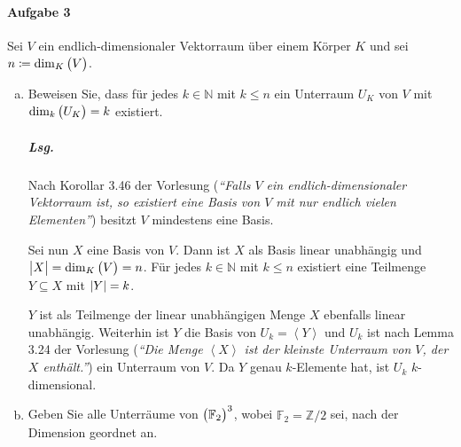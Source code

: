 \documentclass{scrreprt}
\newcommand\hull[1]{\left\langle #1 \right\rangle}
\begin{document}
\paragraph{Aufgabe 3} Sei $V$ ein endlich-dimensionaler Vektorraum über einem
Körper $K$ und sei $n \coloneqq \dim_K\qty\big(V)$.
\begin{enumerate}[(a)]
\item Beweisen Sie, dass für jedes $k \in \mathbb{N}$ mit $k \leq n$ ein
  Unterraum $U_K$ von $V$ mit $\dim_k\qty\big(U_K) = k$ existiert.

  \subparagraph{Lsg.} Nach Korollar 3.46 der Vorlesung (\emph{``Falls $V$ ein
    endlich-dimensionaler Vektorraum ist, so existiert eine Basis von $V$ mit
    nur endlich vielen Elementen''}) besitzt $V$ mindestens eine Basis.

  Sei nun $X$ eine Basis von $V$.
  Dann ist $X$ als Basis linear unabhängig und
  $\abs\big{X} = \dim_K\qty\big(V) = n$.
  Für jedes $k \in \mathbb{N}$ mit $k \leq n$ existiert
  eine Teilmenge $Y \subseteq X$ mit $\abs{Y} = k$.

  $Y$ ist als Teilmenge der linear unabhängigen Menge $X$ ebenfalls linear
  unabhängig.
  Weiterhin ist $Y$ die Basis von $U_k = \hull{Y}$ und $U_k$ ist nach Lemma 3.24
  der Vorlesung (\emph{``Die Menge $\hull{X}$ ist der kleinste Unterraum von
    $V$, der $X$ enthält.''}) ein Unterraum von $V$.
  Da $Y$ genau $k$-Elemente hat, ist $U_k$ $k$-dimensional.

\item Geben Sie alle Unterräume von $\qty\big(\mathbb{F}_2)^3$, wobei
  $\mathbb{F}_2 = \mathbb{Z}/2$ sei, nach der Dimension geordnet an.


\end{enumerate}
\end{document}
